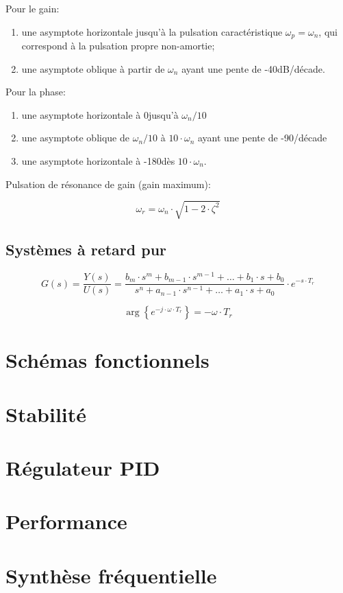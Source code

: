 \documentclass[10pt, twocolumn]{article}
\begin{document}
			Pour le gain:
			
			\begin{enumerate}
				\item une asymptote horizontale jusqu'à la pulsation caractéristique $\omega _p = \omega _n$, qui correspond à la pulsation propre non-amortie;
				\item une asymptote oblique à partir de $\omega _n$ ayant une pente de -40dB/décade.
			\end{enumerate}
			
			Pour la phase:
			
			\begin{enumerate}
				\item une asymptote horizontale à 0\textdegree jusqu'à $\omega_n/10$
				\item une asymptote oblique de $\omega_n/10$ à $10\cdot \omega _n$ ayant une pente de -90\textdegree/décade
				\item une asymptote horizontale à -180\textdegree dès $10\cdot \omega_n$.
			\end{enumerate}
			
			Pulsation de résonance de gain (gain maximum):
			
			\[\omega_{r}=\omega_{n} \cdot \sqrt{1-2 \cdot \zeta^{2}}\]
		
		\subsection{Systèmes à retard pur}
		
			\[G(s)=\frac{Y(s)}{U(s)} = \frac{b_{m} \cdot s^{m}+b_{m-1} \cdot s^{m-1}+\ldots+b_{1} \cdot s+b_{0}}{s^{n}+a_{n-1} \cdot s^{n-1}+\ldots+a_{1} \cdot s+a_{0}} \cdot e^{-s \cdot T_{r}}\]
		
			\[\arg \left\{e^{-j \cdot \omega \cdot T_{r}}\right\}=-\omega \cdot T_{r}\]
	
	\section*{Schémas fonctionnels}
	
	\section*{Stabilité}
	
	\section*{Régulateur PID}
	
	\section*{Performance}
	
	\section*{Synthèse fréquentielle}
	
\end{document}
